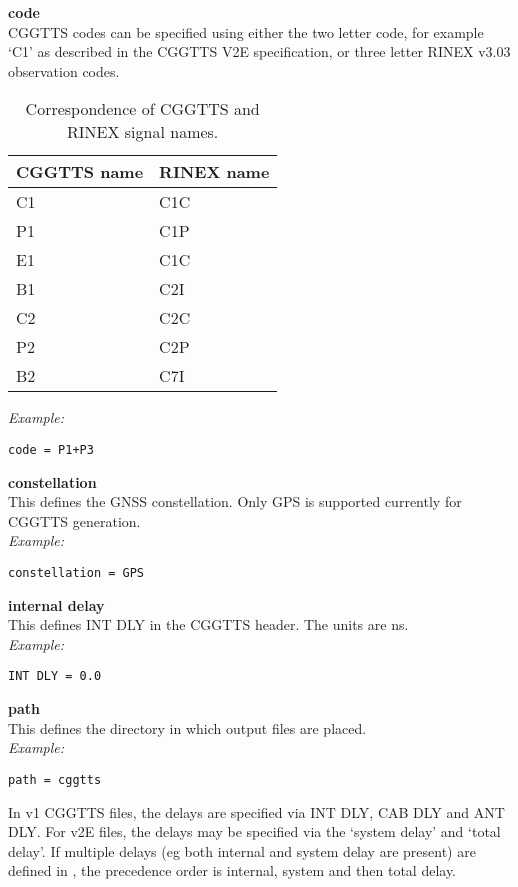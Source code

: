 {\bfseries code}\\

CGGTTS codes can be specified using either the two letter code, for example `C1' as described in the CGGTTS V2E 
specification, or three letter RINEX v3.03 observation codes.
\begin{table}
\begin{tabular}{ll}
	CGGTTS name	 & RINEX name \\ \hline
	C1 & C1C \\
	P1 & C1P \\
	E1 & C1C \\
	B1 & C2I \\
	C2 & C2C \\
	P2 & C2P \\
	B2 & C7I 
\end{tabular}
\caption{Correspondence of CGGTTS and RINEX signal names.}
\end{table}
\textit{Example:}
\begin{lstlisting}
code = P1+P3
\end{lstlisting}

{\bfseries constellation}\\
This defines the GNSS constellation. Only GPS is supported currently for CGGTTS generation.\\
\textit{Example:}
\begin{lstlisting}
constellation = GPS
\end{lstlisting}

{\bfseries internal delay}\\
This defines INT DLY in the CGGTTS header. The units are ns.\\
\textit{Example:}
\begin{lstlisting}
INT DLY = 0.0
\end{lstlisting}

{\bfseries path}\\
This defines the directory in which output files are placed.\\
\textit{Example:}
\begin{lstlisting}
path = cggtts
\end{lstlisting}

In v1 CGGTTS files, the delays are specified via INT DLY, CAB DLY and ANT DLY.  
For v2E files, the delays may be specified via the `system delay' and `total delay'.
If multiple delays (eg both internal and system delay are present) are defined in
, the precedence order is internal, system and then total delay.

